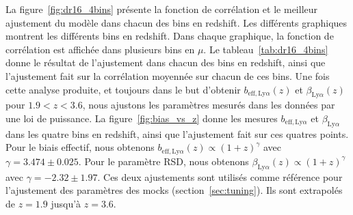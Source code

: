 \documentclass[11pt, twoside, a4paper, openright]{report}
\begin{document}
La figure~\ref{fig:dr16_4bins} présente la fonction de corrélation et le meilleur ajustement du modèle dans chacun des bins en redshift. Les différents graphiques montrent les différents bins en redshift. Dans chaque graphique, la fonction de corrélation est affichée dans plusieurs bins en $\mu$. Le tableau~\ref{tab:dr16_4bins} donne le résultat de l'ajustement dans chacun des bins en redshift, ainsi que l'ajustement fait sur la corrélation moyennée sur chacun de ces bins.
Une fois cette analyse produite, et toujours dans le but d'obtenir $b_{\mathrm{eff},\mathrm{Ly}\alpha}(z)$ et $\beta_{\mathrm{Ly}\alpha}(z)$ pour $\num{1.9} < z  < \num{3.6}$, nous ajustons les paramètres \lya{} mesurés dans les données par une loi de puissance. La figure~\ref{fig:bias_vs_z} donne les mesures $b_{\mathrm{eff},\mathrm{Ly}\alpha}$ et $\beta_{\mathrm{Ly}\alpha}$ dans les quatre bins en redshift, ainsi que l'ajustement fait sur ces quatres points. Pour le biais effectif, nous obtenons $b_{\mathrm{eff},\mathrm{Ly}\alpha}(z) \propto (1+z)^{\gamma}$ avec $\gamma = \num{3.474} \pm \num{0.025}$. Pour le paramètre RSD, nous obtenons $\beta_{\mathrm{Ly}\alpha}(z) \propto (1+z)^{\gamma}$ avec $\gamma = - \num{2.32} \pm \num{1.97}$. Ces deux ajustements sont utilisés comme référence pour l'ajustement des paramètres des mocks (section~\ref{sec:tuning}). Ils sont extrapolés de $z = \num{1.9}$ jusqu'à $z = \num{3.6}$.
\end{document}
